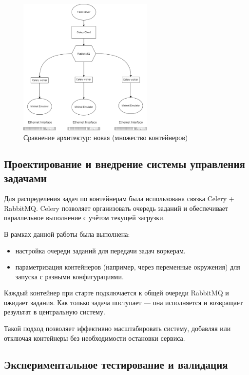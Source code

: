 \begin{figure}[H]
  \centering
  \includegraphics[width=0.60\textwidth]{figures/example.png}
  \caption{Сравнение архитектур: новая (множество контейнеров)}
  \label{fig:arch_compare}
\end{figure}

\subsection{Проектирование и внедрение системы управления задачами}
\label{subsec:task2}

Для распределения задач по контейнерам была использована связка Celery\cite{celery} + RabbitMQ\cite{miminet}.
Celery\cite{celery} позволяет организовать очередь заданий и обеспечивает параллельное выполнение с учётом текущей загрузки.

В рамках данной работы была выполнена:
\begin{itemize}
  \item настройка очереди заданий для передачи задач воркерам.
  \item параметризация контейнеров (например, через переменные окружения) для запуска с разными конфигурациями.
\end{itemize}

Каждый контейнер при старте подключается к общей очереди RabbitMQ\cite{rabbitmq} и ожидает задания.
Как только задача поступает — она исполняется и возвращает результат в центральную систему.

Такой подход позволяет эффективно масштабировать систему, добавляя или отключая контейнеры без необходимости остановки сервиса.

\subsection{Экспериментальное тестирование и валидация}
\label{subsec:task3}

